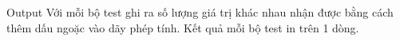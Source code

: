 Output  
Với mỗi bộ test ghi ra số lượng giá trị khác nhau nhận được bằng cách thêm dấu ngoặc vào dãy phép tính. Kết quả mỗi bộ test in trên 1 dòng.